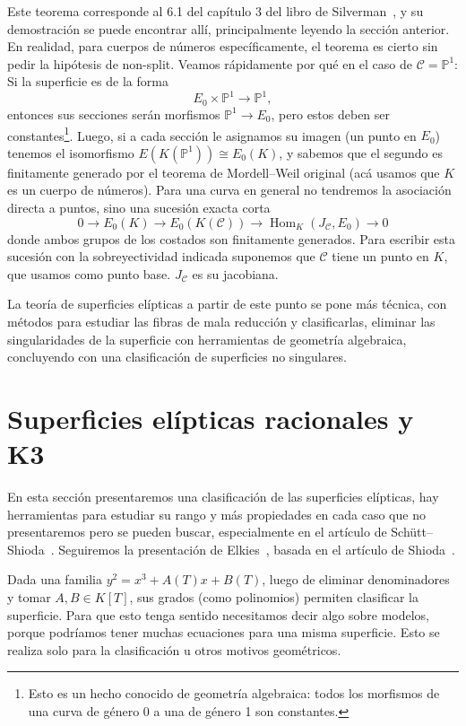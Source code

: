 \documentclass[a4paper]{book}
\theoremstyle{definition}
\theoremstyle{plain}
\newcommand{\PP}{\mathbb{P}}
\newcommand{\cc}{\mathcal{C}}
\begin{document}
Este teorema corresponde al 6.1 del capítulo 3 del libro de Silverman~\cite{SilvermanAdvanced}, y su demostración se puede encontrar allí, principalmente leyendo la sección anterior. En realidad, para cuerpos de números específicamente, el teorema es cierto sin pedir la hipótesis de non-split. Veamos rápidamente por qué en el caso de $\cc=\PP^1$: Si la superficie es de la forma
\[
E_0\times\PP^1 \to \PP^1,
\]
entonces sus secciones serán morfismos $\PP^1\to E_0$, pero estos deben ser constantes\footnote{Esto es un hecho conocido de geometría algebraica: todos los morfismos de una curva de género 0 a una de género 1 son constantes.}. Luego, si a cada sección le asignamos su imagen (un punto en $E_0$) tenemos el isomorfismo $E(K(\PP^1)) \cong E_0(K)$, y sabemos que el segundo es finitamente generado por el teorema de Mordell--Weil original (acá usamos que $K$ es un cuerpo de números). Para una curva en general no tendremos la asociación directa a puntos, sino una sucesión exacta corta
\[
0\to E_0(K) \to E_0(K(\cc)) \to \operatorname{Hom}_K(J_\cc , E_0) \to 0
\]
donde ambos grupos de los costados son finitamente generados. Para escribir esta sucesión con la sobreyectividad indicada suponemos que $\cc$ tiene un punto en $K$, que usamos como punto base. $J_\cc$ es su jacobiana.

La teoría de superficies elípticas a partir de este punto se pone más técnica, con métodos para estudiar las fibras de mala reducción y clasificarlas, eliminar las singularidades de la superficie con herramientas de geometría algebraica, concluyendo con una clasificación de superficies no singulares. 

\section{Superficies elípticas racionales y K3}\label{sec:superficiesK3}

En esta sección presentaremos una clasificación de las superficies elípticas, hay herramientas para estudiar su rango y más propiedades en cada caso que no presentaremos pero se pueden buscar, especialmente en el artículo de Schütt--Shioda~\cite{SchuttShioda2010}. Seguiremos la presentación de Elkies~\cite{Elkies2007HighRank}, basada en el artículo de Shioda~\cite{Shioda1990MordellWeil}.

Dada una familia $y^2=x^3+A(T)x+B(T)$, luego de eliminar denominadores y tomar $A,B \in K[T]$, sus grados (como polinomios) permiten clasificar la superficie. Para que esto tenga sentido necesitamos decir algo sobre modelos, porque podríamos tener muchas ecuaciones para una misma superficie. Esto se realiza solo para la clasificación u otros motivos geométricos. 
\end{document}
